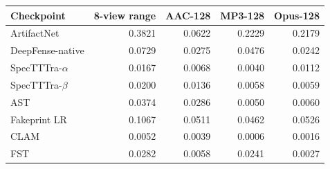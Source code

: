 \begin{tabular}{lrrrr}
\toprule
Checkpoint & 8-view range & AAC-128 & MP3-128 & Opus-128 \\
\midrule
ArtifactNet & 0.3821 & 0.0622 & 0.2229 & 0.2179 \\
DeepFense-native & 0.0729 & 0.0275 & 0.0476 & 0.0242 \\
SpecTTTra-$\alpha$ & 0.0167 & 0.0068 & 0.0040 & 0.0112 \\
SpecTTTra-$\beta$ & 0.0200 & 0.0136 & 0.0058 & 0.0059 \\
AST & 0.0374 & 0.0286 & 0.0050 & 0.0060 \\
Fakeprint LR & 0.1067 & 0.0511 & 0.0462 & 0.0526 \\
CLAM & 0.0052 & 0.0039 & 0.0006 & 0.0016 \\
FST & 0.0282 & 0.0058 & 0.0241 & 0.0027 \\
\bottomrule
\end{tabular}
